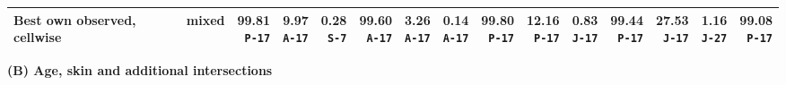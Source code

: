\documentclass[10pt]{article}
\begin{document}
{\begin{tabular*}{\linewidth}{@{\extracolsep{\fill}}llrrrrrrrrrrrrr}
\midrule\rowcolor{blue!8} Best own observed, cellwise & mixed & \shortstack{\textbf{99.81}\\{\tiny\texttt{P-17}}} & \shortstack{\textbf{9.97}\\{\tiny\texttt{A-17}}} & \shortstack{\textbf{0.28}\\{\tiny\texttt{S-7}}} & \shortstack{\textbf{99.60}\\{\tiny\texttt{A-17}}} & \shortstack{\textbf{3.26}\\{\tiny\texttt{A-17}}} & \shortstack{\textbf{0.14}\\{\tiny\texttt{A-17}}} & \shortstack{\textbf{99.80}\\{\tiny\texttt{P-17}}} & \shortstack{\textbf{12.16}\\{\tiny\texttt{P-17}}} & \shortstack{\textbf{0.83}\\{\tiny\texttt{J-17}}} & \shortstack{\textbf{99.44}\\{\tiny\texttt{P-17}}} & \shortstack{\textbf{27.53}\\{\tiny\texttt{J-17}}} & \shortstack{\textbf{1.16}\\{\tiny\texttt{J-27}}} & \shortstack{\textbf{99.08}\\{\tiny\texttt{P-17}}}\\
\bottomrule\end{tabular*}}\par
\vspace{2mm}
\textbf{(B) Age, skin and additional intersections}\par
\end{document}

